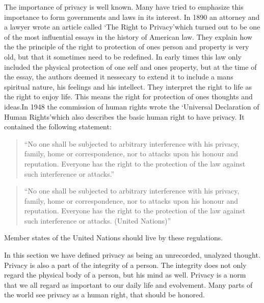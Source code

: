 The importance of privacy is well known. Many have tried to emphasize this importance to form governments and laws in its interest.
In 1890 an attorney and a lawyer wrote an article called  \lq The Right to Privacy\rq which turned out to be one of the most influential essays in the history of American law.\cite{website:the-right-to-privacy-info}
They explain how the the principle of the right to protection of ones person and property is very old, but that it sometimes need to be redefined. In early times this law only included the physical protection of one self and ones property, but at the time of the essay, the authors deemed it nessecary to extend it to include a mans spiritual nature, his feelings and his intellect. They interpret the right to life as the right to enjoy life. This means the right for protection of ones thoughts and ideas.In 1948 the commission of human rights wrote the \lq Universal Declaration of Human Rights\rq which also describes the basic human right to have privacy. It contained the following statement:

\blockquote{``No one shall be subjected to arbitrary interference with his privacy, family, home or correspondence, nor to attacks upon his honour and reputation. Everyone has the right to the protection of the law against such interference or attacks.''\cite{website:un-human-rights}}

\blockquote{``No one shall be subjected to arbitrary interference with his privacy, family, home or correspondence, nor to attacks upon his honour and reputation. Everyone has the right to the protection of the law against such interference or attacks. (United Nations)''\cite{website:un-human-rights}}
Member states of the United Nations should live by these regulations.


In this section we have defined privacy as being an unrecorded, unalyzed thought. Privacy is also a part of the integrity of a person. The integrity does not only regard the physical body of a person, but his mind as well.
Privacy is a norm that we all regard as important to our daily life and evolvement. Many parts of the world see privacy as a human right, that should be honored.
